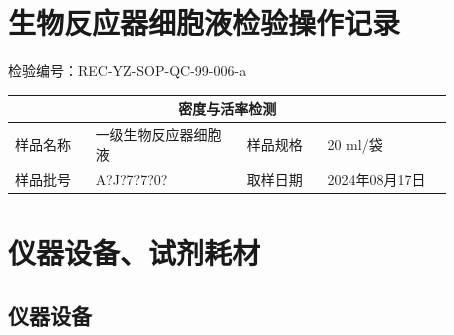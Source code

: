 \documentclass[UTF8,10pt,a4paper,fontset=fandol]{ctexart}
\newcommand{\fieldvalue}[1]{#1}
\newcommand{\handwritten}[1]{#1}
\begin{document}
\newpage

\section*{生物反应器细胞液检验操作记录}

\noindent
检验编号：REC-YZ-SOP-QC-99-006-a

\begin{center}
\begin{tabular}{|p{0.16\linewidth}|p{0.30\linewidth}|p{0.16\linewidth}|p{0.25\linewidth}|}
\hline
\multicolumn{4}{c}{密度与活率检测} \\
\hline
样品名称 &
\fieldvalue{\handwritten{一级生物反应器细胞液}} &
样品规格 &
\fieldvalue{\handwritten{20}} ml/袋 \\
\hline
样品批号 &
\fieldvalue{\handwritten{A?J?7?7?0?}} &
取样日期 &
\fieldvalue{\handwritten{2024年08月17日}} \\
\hline
\end{tabular}
\end{center}

\section{仪器设备、试剂耗材}

\subsection{仪器设备}
\end{document}

